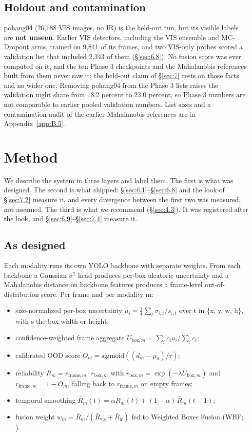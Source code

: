 \documentclass[10pt]{article}
\begin{document}
\subsection{Holdout and contamination}\label{sec:3.6}
pohang04 (26,188 VIS images, no IR) is the held-out run, but its visible labels are \textbf{not unseen}. Earlier VIS detectors, including the VIS ensemble and MC-Dropout arms, trained on 9,841 of its frames, and two VIS-only probes scored a validation list that included 2,343 of them (\S\ref{sec:6.8}). No fusion score was ever computed on it, and the ten Phase 3 checkpoints and the Mahalanobis references built from them never saw it; the held-out claim of \S\ref{sec:7} rests on those facts and no wider one. Removing pohang04 from the Phase 3 lists raises the validation night share from 18.2 percent to 23.0 percent, so Phase 3 numbers are not comparable to earlier pooled validation numbers. List sizes and a contamination audit of the earlier Mahalanobis references are in Appendix~\ref{app:B.5}.

\section{Method}\label{sec:4}
We describe the system in three layers and label them. The first is what was designed. The second is what shipped: \S\ref{sec:6.1}--\S\ref{sec:6.8} and the look of \S\ref{sec:7.2} measure it, and every divergence between the first two was measured, not assumed. The third is what we recommend (\S\ref{sec:4.3}). It was registered after the look, and \S\ref{sec:6.9}--\S\ref{sec:7.4} measure it.

\subsection{As designed}\label{sec:4.1}
Each modality runs its own YOLO backbone with separate weights. From each backbone a Gaussian $\sigma$$^{2}$ head produces per-box aleatoric uncertainty and a Mahalanobis distance on backbone features produces a frame-level out-of-distribution score. Per frame and per modality m:

\begin{itemize}
\item size-normalized per-box uncertainty $u_i = \frac{1}{4}\sum_t \sigma_{i,t}/s_{i,t}$ over t in \{x, y, w, h\}, with s the box width or height;
\item confidence-weighted frame aggregate $U_{\mathrm{box},m} = \sum_i c_i u_i / \sum_i c_i$;
\item calibrated OOD score $O_m = \mathrm{sigmoid}((d_m - \mu_d)/\tau)$;
\item reliability $R_m = r_{\mathrm{frame},m} \cdot r_{\mathrm{box},m}$ with $r_{\mathrm{box},m} = \exp(-\lambda U_{\mathrm{box},m})$ and $r_{\mathrm{frame},m} = 1 - O_m$, falling back to $r_{\mathrm{frame},m}$ on empty frames;
\item temporal smoothing $\bar{R}_m(t) = \alpha R_m(t) + (1 - \alpha)\,\bar{R}_m(t-1)$;
\item fusion weight $w_m = \bar{R}_m / (\bar{R}_{\mathrm{vis}} + \bar{R}_{\mathrm{ir}})$ fed to Weighted Boxes Fusion (WBF; \citealp{solovyev2021weighted}).
\end{itemize}
\end{document}
